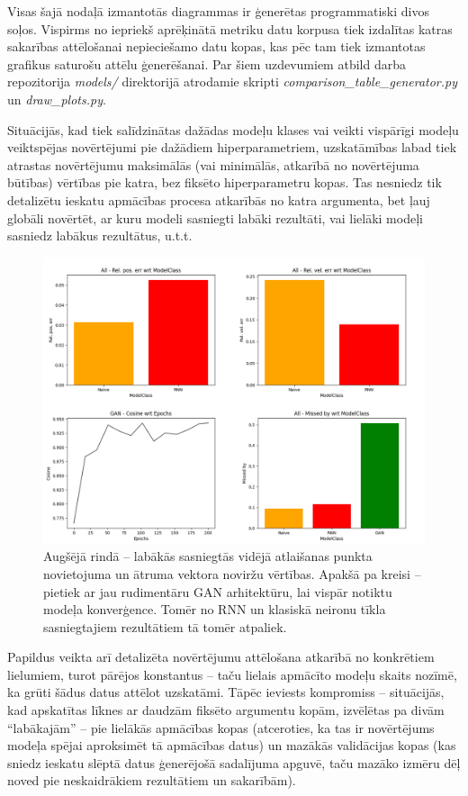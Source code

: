 \documentclass[12pt, a4paper]{article}
\numberwithin{equation}{section} %
\begin{document}
Visas šajā nodaļā izmantotās diagrammas ir ģenerētas programmatiski divos soļos. Vispirms no iepriekš aprēķinātā metriku datu korpusa tiek izdalītas katras sakarības attēlošanai nepieciešamo datu kopas, kas pēc tam tiek izmantotas grafikus saturošu attēlu ģenerēšanai. Par šiem uzdevumiem atbild darba repozitorija \cite{md_repo} \textit{models/} direktorijā atrodamie skripti \textit{comparison\_table\_generator.py} un \textit{draw\_plots.py}.

Situācijās, kad tiek salīdzinātas dažādas modeļu klases vai veikti vispārīgi modeļu veiktspējas novērtējumi pie dažādiem hiperparametriem, uzskatāmības labad tiek atrastas novērtējumu maksimālās (vai minimālās, atkarībā no novērtējuma būtības) vērtības pie katra, bez fiksēto hiperparametru kopas. Tas nesniedz tik detalizētu ieskatu apmācības procesa atkarībās no katra argumenta, bet ļauj globāli novērtēt, ar kuru modeli sasniegti labāki rezultāti, vai lielāki modeļi sasniedz labākus rezultātus, u.t.t. 

\begin{figure}[t!]
    \centering
    \includegraphics[width=16cm,page=1]{../img/throw_metrics_gan.png}
    \caption{Augšējā rindā -- labākās sasniegtās vidējā atlaišanas punkta novietojuma un ātruma vektora noviržu vērtības. Apakšā pa kreisi -- pietiek ar jau rudimentāru GAN arhitektūru, lai vispār notiktu modeļa konverģence. Tomēr no RNN un klasiskā neironu tīkla sasniegtajiem rezultātiem tā tomēr atpaliek.}
\end{figure}

Papildus veikta arī detalizēta novērtējumu attēlošana atkarībā no konkrētiem lielumiem, turot pārējos konstantus -- taču lielais apmācīto modeļu skaits nozīmē, ka grūti šādus datus attēlot uzskatāmi. Tāpēc ieviests kompromiss -- situācijās, kad apskatītas līknes ar daudzām fiksēto argumentu kopām, izvēlētas pa divām ``labākajām'' -- pie lielākās apmācības kopas (atceroties, ka tas ir novērtējums modeļa spējai aproksimēt tā apmācības datus) un mazākās validācijas kopas (kas sniedz ieskatu slēptā datus ģenerējošā sadalījuma apguvē, taču mazāko izmēru dēļ noved pie neskaidrākiem rezultātiem un sakarībām).
\end{document}
